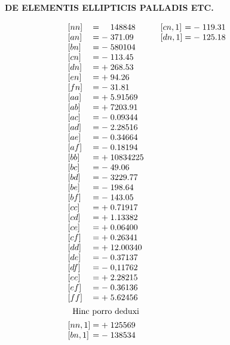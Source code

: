 \parbox[t]{\dimexpr\linewidth-24mm\relax}{\centering\fontsize{7.4}{9.2}\selectfont\bfseries DE ELEMENTIS ELLIPTICIS PALLADIS ETC.\par}%
\par\nobreak\smallskip
{\fontsize{9}{11}\selectfont
\[
\begin{array}{@{}l@{\qquad}l@{\qquad}l@{}}
\begin{array}[t]{@{}l@{\;}c@{\;}c@{\;}l@{}}
{[nn]}&=&&148848\\
{[an]}&=&-&371.09\\
{[bn]}&=&-&580104\\
{[cn]}&=&-&113.45\\
{[dn]}&=&+&268.53\\
{[en]}&=&+&94.26\\
{[fn]}&=&-&31.81\\
{[aa]}&=&+&5.91569\\
{[ab]}&=&+&7203.91\\
{[ac]}&=&-&0.09344\\
{[ad]}&=&-&2.28516\\
{[ae]}&=&-&0.34664\\
{[af]}&=&-&0.18194\\
{[bb]}&=&+&10834225\\
{[bc]}&=&-&49.06\\
{[bd]}&=&-&3229.77\\
{[be]}&=&-&198.64\\
{[bf]}&=&-&143.05\\
{[cc]}&=&+&0.71917\\
{[cd]}&=&+&1.13382\\
{[ce]}&=&+&0.06400\\
{[cf]}&=&+&0.26341\\
{[dd]}&=&+&12.00340\\
{[de]}&=&-&0.37137\\
{[df]}&=&-&0{,}11762\\
{[ee]}&=&+&2.28215\\
{[ef]}&=&-&0.36136\\
{[ff]}&=&+&5.62456\\[4.5pt]
\multicolumn{4}{@{}c@{}}{\text{Hinc porro deduxi}}\\[4.5pt]
{[nn,1]}&=&+&125569\\
{[bn,1]}&=&-&138534
\end{array}&
\begin{array}[t]{@{}l@{\;}c@{\;}c@{\;}l@{}}
{[cn,1]}&=&-&119.31\\
{[dn,1]}&=&-&125.18\\

\end{array}
\end{array}\]}
